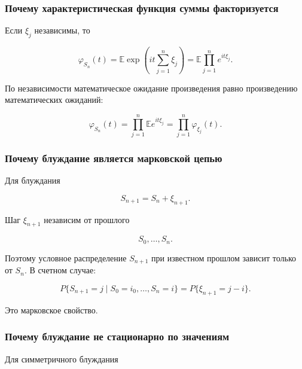 \documentclass[
  11pt,
  a4paper,
]{article}
\begin{document}
\subsubsection{Почему характеристическая функция суммы
факторизуется}\label{ux43fux43eux447ux435ux43cux443-ux445ux430ux440ux430ux43aux442ux435ux440ux438ux441ux442ux438ux447ux435ux441ux43aux430ux44f-ux444ux443ux43dux43aux446ux438ux44f-ux441ux443ux43cux43cux44b-ux444ux430ux43aux442ux43eux440ux438ux437ux443ux435ux442ux441ux44f}

Если \(\xi_j\) независимы, то

\[
\varphi_{S_n}(t)
=
\mathbb E\exp\left(it\sum_{j=1}^n\xi_j\right)
=
\mathbb E\prod_{j=1}^n e^{it\xi_j}.
\]

По независимости математическое ожидание произведения равно произведению
математических ожиданий:

\[
\varphi_{S_n}(t)
=
\prod_{j=1}^n\mathbb E e^{it\xi_j}
=
\prod_{j=1}^n\varphi_{\xi_j}(t).
\]

\subsubsection{Почему блуждание является марковской
цепью}\label{ux43fux43eux447ux435ux43cux443-ux431ux43bux443ux436ux434ux430ux43dux438ux435-ux44fux432ux43bux44fux435ux442ux441ux44f-ux43cux430ux440ux43aux43eux432ux441ux43aux43eux439-ux446ux435ux43fux44cux44e}

Для блуждания

\[
S_{n+1}=S_n+\xi_{n+1}.
\]

Шаг \(\xi_{n+1}\) независим от прошлого

\[
S_0,\ldots,S_n.
\]

Поэтому условное распределение \(S_{n+1}\) при известном прошлом зависит
только от \(S_n\). В счетном случае:

\[
P\{S_{n+1}=j\mid S_0=i_0,\ldots,S_n=i\}
=
P\{\xi_{n+1}=j-i\}.
\]

Это марковское свойство.

\subsubsection{Почему блуждание не стационарно по
значениям}\label{ux43fux43eux447ux435ux43cux443-ux431ux43bux443ux436ux434ux430ux43dux438ux435-ux43dux435-ux441ux442ux430ux446ux438ux43eux43dux430ux440ux43dux43e-ux43fux43e-ux437ux43dux430ux447ux435ux43dux438ux44fux43c}

Для симметричного блуждания
\end{document}
